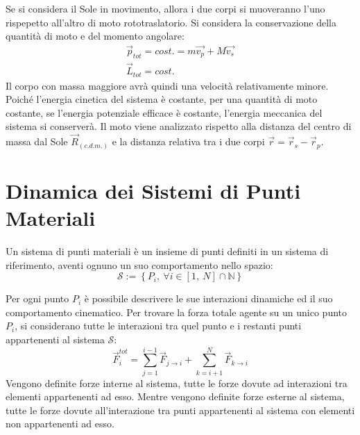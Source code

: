 \documentclass{article}
\numberwithin{equation}{subsection}
\begin{document}
Se si considera il Sole in movimento, allora i due corpi si muoveranno l'uno rispepetto all'altro di moto rototraslatorio. Si considera la conservazione della quantità di moto 
e del momento angolare: 
\begin{gather*}
    \vec{p}_{tot}=cost.=m\vec{v_p}+M\vec{v_s}\\
    \vec{L}_{tot}=cost.
\end{gather*}
Il corpo con massa maggiore avrà quindi una velocità relativamente minore. Poiché l'energia cinetica del sistema è costante, per una quantità di moto costante, 
se l'energia potenziale efficace è costante, l'energia meccanica del sistema si conserverà. Il moto viene analizzato rispetto alla distanza 
del centro di massa dal Sole $\vec{R}_{(c.d.m.)}$ e la distanza relativa tra i due corpi $\vec{r}=\vec{r}_s-\vec{r}_p$. 

\clearpage

\section{Dinamica dei Sistemi di Punti Materiali}

Un sistema di punti materiali è un insieme di punti definiti 
in un sistema di riferimento, aventi ognuno un suo 
comportamento nello spazio:
\begin{equation}
    \mathscr{S}:=\left\{P_i,\:\forall i\in[1,\:N]\cap\mathbb{N}\right\}
\end{equation}

\begin{center}\end{center}

Per ogni punto $P_i$ è possibile descrivere le sue interazioni dinamiche ed il suo comportamento cinematico. 
Per trovare la forza totale agente su un unico punto $P_i$, si 
considerano tutte le interazioni tra quel punto e i restanti punti 
appartenenti al sistema $\mathscr{S}$:
\begin{equation}
    \vec{F}^{tot}_i=\displaystyle\sum_{j=1}^{i-1}\vec{F}_{j\to i}+\sum_{k=i+1}^{N}\vec{F}_{k\to i}
\end{equation}
Vengono definite forze interne al sistema, tutte le forze 
dovute ad interazioni tra elementi appartenenti ad esso.
Mentre vengono definite forze esterne al sistema, tutte le forze 
dovute all'interazione tra punti appartenenti al sistema con 
elementi non appartenenti ad esso. 
\end{document}
